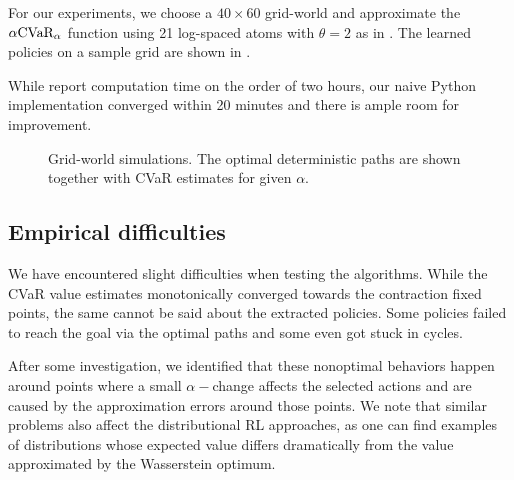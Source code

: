 For our experiments, we choose a $40 \times 60$ grid-world and approximate the $\alpha\text{CVaR}_\alpha$ function using 21 log-spaced atoms with $\theta=2$ as in \citep{chow2015risk}. The learned policies on a sample grid are shown in .

While \citet{chow2015risk} report computation time on the order of two hours, our naive Python implementation converged within 20 minutes and there is ample room for improvement.

\begin{figure}[h]
\center
{}
\caption{Grid-world simulations. The optimal deterministic paths are shown together with CVaR estimates for given $\alpha$. }
\label{fig:vigrid}
\end{figure}

\subsection{Empirical difficulties}
We have encountered slight difficulties when testing the algorithms. While the CVaR value estimates monotonically converged towards the contraction fixed points, the same cannot be said about the extracted policies. Some policies failed to reach the goal via the optimal paths and some even got stuck in cycles.

After some investigation, we identified that these nonoptimal behaviors happen around points where a small $\alpha-$change affects the selected actions and are caused by the approximation errors around those points. We note that similar problems also affect the distributional RL approaches, as one can find examples of distributions whose expected value differs dramatically from the value approximated by the Wasserstein optimum.

